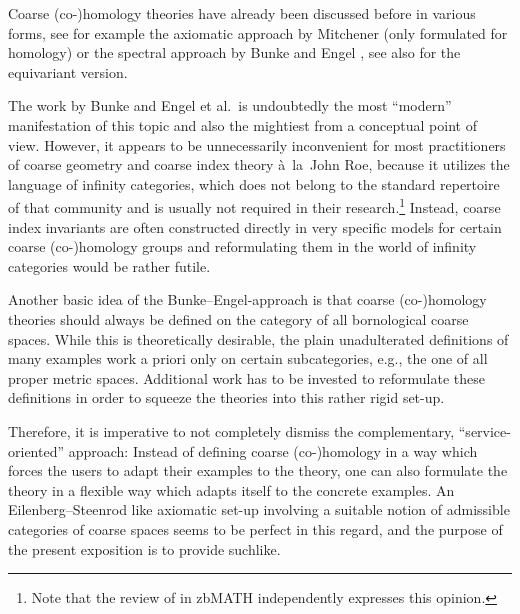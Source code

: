 \documentclass[pdftex]{sigma}
\numberwithin{equation}{section}
\theoremstyle{definition}
\begin{document}
Coarse \mbox{(co-)}homology theories have already been discussed before in various forms, see for example the axiomatic approach by Mitchener \cite{MitchenerCoarse} (only formulated for homology) or the spectral approach by Bunke and Engel \cite{BunkeEngel_CoarseCohomologyTheories, BunkeEngel_homotopy}, see also \cite{BunkeEngelKasprowskiWinges} for the equivariant version.

The work by Bunke and Engel et al.\ is undoubtedly the most ``modern'' manifestation of this topic and also the mightiest from a conceptual point of view.
However, it appears to be unnecessarily inconvenient for most practitioners of coarse geometry and coarse index theory \`a~la~John Roe, because it utilizes the language of infinity categories, which does not belong to the standard repertoire of that community and is usually not required in their research.\footnote{Note that the review of \cite{BunkeEngel_homotopy} in zbMATH independently expresses this opinion.}
Instead, coarse index invariants are often constructed directly in very specific models for certain coarse (co-)homology groups and reformulating them in the world of infinity categories would be rather futile.

Another basic idea of the Bunke--Engel-approach is that coarse (co-)homology theories should always be defined on the category of all bornological coarse spaces. While this is theoretically desirable, the plain unadulterated definitions of many examples work a priori only on certain subcategories, e.g., the one of all proper metric spaces. Additional work has to be invested to reformulate these definitions in order to squeeze the theories into this rather rigid set-up.

Therefore, it is imperative to not completely dismiss the complementary, ``service-oriented'' approach: Instead of defining coarse (co-)homology in a way which forces the users to adapt their examples to the theory, one can also formulate the theory in a flexible way which adapts itself to the concrete examples.
An Eilenberg--Steenrod like axiomatic set-up involving a suitable notion of admissible categories of coarse spaces seems to be perfect in this regard, and the purpose of the present exposition is to provide suchlike.
\end{document}
